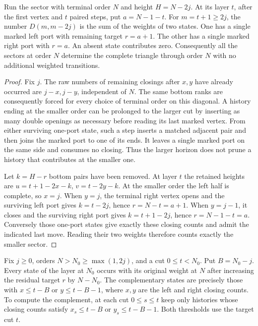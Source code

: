\begin{proposition}
\label{prop:earlier-orders}
Run the sector with terminal order \(N\) and height \(H=N-2j\). At its
layer \(t\), after the first vertex and \(t\) paired steps, put
\(a=N-1-t\). For \(m=t+1\ge2j\), the number \(D(m,m-2j)\) is the sum
of the weights of two states. One has a single marked left port with remaining
target \(r=a+1\). The other has a single marked right port with \(r=a\).
An absent state contributes zero. Consequently all the sectors at
order \(N\) determine the complete triangle through order \(N\) with
no additional weighted transitions.
\end{proposition}

\begin{proof}
Fix \(j\). The raw numbers of remaining closings after \(x,y\) have
already occurred are \(j-x,j-y\), independent of \(N\). The same
bottom ranks are consequently forced for every choice of terminal
order on this diagonal. A history ending at the smaller order can
be prolonged to the larger cut by inserting as many double openings as
necessary before reading its last marked vertex. From either surviving
one-port state, such a step inserts a matched adjacent pair and then
joins the marked port to one of its ends. It leaves a single marked
port on the same side and consumes no closing. Thus the larger horizon
does not prune a history that contributes at the smaller one.

Let \(k=H-r\) bottom pairs have been removed. At layer \(t\) the
retained heights are \(u=t+1-2x-k\), \(v=t-2y-k\). At the smaller
order the left half is complete, so \(x=j\). When \(y=j\), the terminal
right vertex opens and the surviving left port gives
\(k=t-2j\), hence \(r=N-t=a+1\). When \(y=j-1\), it closes and the
surviving right port gives \(k=t+1-2j\), hence \(r=N-1-t=a\).
Conversely those one-port states give exactly these closing counts
and admit the indicated last move. Reading their two weights therefore
counts exactly the smaller sector.
\end{proof}

\begin{proposition}\label{prop:lift-layer}
Fix \(j\ge0\), orders \(N>N_0\ge\max(1,2j)\), and a cut
\(0\le t<N_0\). Put \(B=N_0-j\). Every state of the layer at \(N_0\)
occurs with its original weight at \(N\) after increasing the residual
target \(r\) by \(N-N_0\). The complementary states are precisely those
with \(x\le t-B\) or \(y\le t-B-1\), where \(x,y\) are the left
and right closing counts. To compute the complement, at each cut
\(0\le s\le t\) keep only histories whose closing counts satisfy
\(x_s\le t-B\) or \(y_s\le t-B-1\). Both thresholds use the target
cut \(t\).
\end{proposition}

